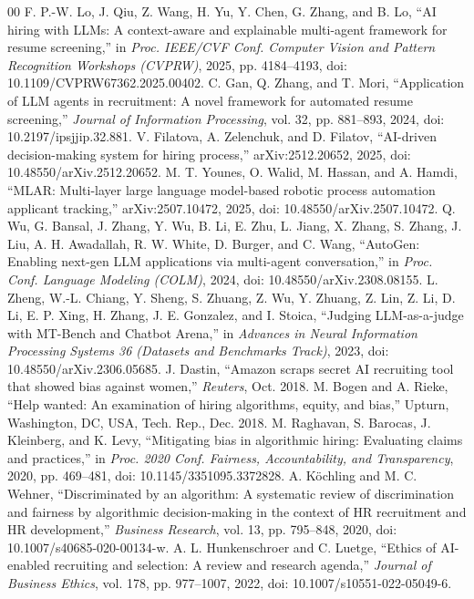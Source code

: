 \documentclass[conference]{IEEEtran}
\begin{document}
\begin{thebibliography}{00}
 F. P.-W. Lo, J. Qiu, Z. Wang, H. Yu, Y. Chen, G. Zhang, and B. Lo, ``AI hiring with LLMs: A context-aware and explainable multi-agent framework for resume screening,'' in \textit{Proc. IEEE/CVF Conf. Computer Vision and Pattern Recognition Workshops (CVPRW)}, 2025, pp. 4184--4193, doi: 10.1109/CVPRW67362.2025.00402.
 C. Gan, Q. Zhang, and T. Mori, ``Application of LLM agents in recruitment: A novel framework for automated resume screening,'' \textit{Journal of Information Processing}, vol. 32, pp. 881--893, 2024, doi: 10.2197/ipsjjip.32.881.
 V. Filatova, A. Zelenchuk, and D. Filatov, ``AI-driven decision-making system for hiring process,'' arXiv:2512.20652, 2025, doi: 10.48550/arXiv.2512.20652.
 M. T. Younes, O. Walid, M. Hassan, and A. Hamdi, ``MLAR: Multi-layer large language model-based robotic process automation applicant tracking,'' arXiv:2507.10472, 2025, doi: 10.48550/arXiv.2507.10472.
 Q. Wu, G. Bansal, J. Zhang, Y. Wu, B. Li, E. Zhu, L. Jiang, X. Zhang, S. Zhang, J. Liu, A. H. Awadallah, R. W. White, D. Burger, and C. Wang, ``AutoGen: Enabling next-gen LLM applications via multi-agent conversation,'' in \textit{Proc. Conf. Language Modeling (COLM)}, 2024, doi: 10.48550/arXiv.2308.08155.
 L. Zheng, W.-L. Chiang, Y. Sheng, S. Zhuang, Z. Wu, Y. Zhuang, Z. Lin, Z. Li, D. Li, E. P. Xing, H. Zhang, J. E. Gonzalez, and I. Stoica, ``Judging LLM-as-a-judge with MT-Bench and Chatbot Arena,'' in \textit{Advances in Neural Information Processing Systems 36 (Datasets and Benchmarks Track)}, 2023, doi: 10.48550/arXiv.2306.05685.
 J. Dastin, ``Amazon scraps secret AI recruiting tool that showed bias against women,'' \textit{Reuters}, Oct. 2018.
 M. Bogen and A. Rieke, ``Help wanted: An examination of hiring algorithms, equity, and bias,'' Upturn, Washington, DC, USA, Tech. Rep., Dec. 2018.
 M. Raghavan, S. Barocas, J. Kleinberg, and K. Levy, ``Mitigating bias in algorithmic hiring: Evaluating claims and practices,'' in \textit{Proc. 2020 Conf. Fairness, Accountability, and Transparency}, 2020, pp. 469--481, doi: 10.1145/3351095.3372828.
 A. K\"ochling and M. C. Wehner, ``Discriminated by an algorithm: A systematic review of discrimination and fairness by algorithmic decision-making in the context of HR recruitment and HR development,'' \textit{Business Research}, vol. 13, pp. 795--848, 2020, doi: 10.1007/s40685-020-00134-w.
 A. L. Hunkenschroer and C. Luetge, ``Ethics of AI-enabled recruiting and selection: A review and research agenda,'' \textit{Journal of Business Ethics}, vol. 178, pp. 977--1007, 2022, doi: 10.1007/s10551-022-05049-6.

\end{thebibliography}
\end{document}
